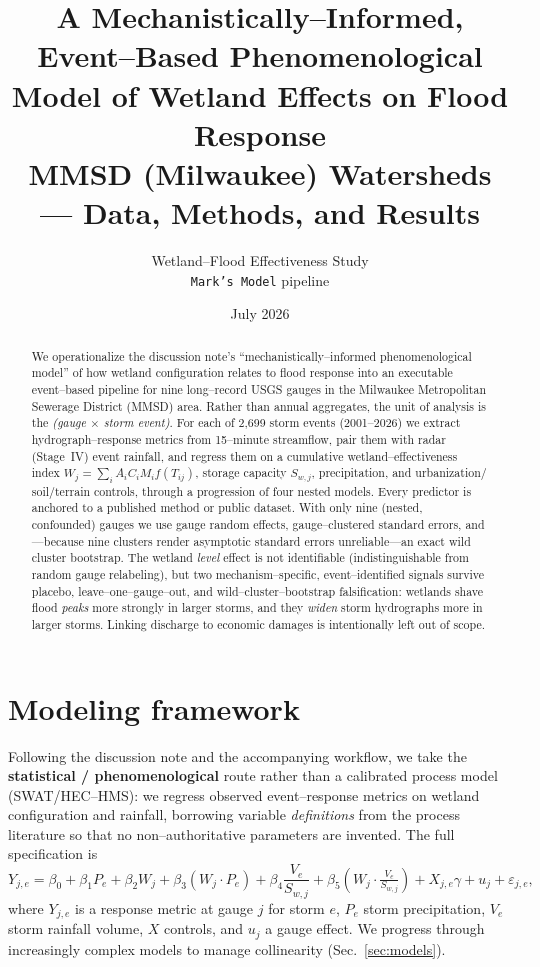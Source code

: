 \documentclass[11pt]{article}
\title{\textbf{A Mechanistically--Informed, Event--Based Phenomenological Model
of Wetland Effects on Flood Response} \\[4pt]
\large MMSD (Milwaukee) Watersheds --- Data, Methods, and Results}
\author{Wetland--Flood Effectiveness Study \\ \texttt{Mark's Model} pipeline}
\date{July 2026}
\newcommand{\Wj}{W_{j}}
\newcommand{\Swj}{S_{w,j}}
\begin{document}
\maketitle

\begin{abstract}
\noindent
We operationalize the discussion note's ``mechanistically--informed phenomenological
model'' of how wetland configuration relates to flood response into an executable
event--based pipeline for nine long--record USGS gauges in the Milwaukee Metropolitan
Sewerage District (MMSD) area. Rather than annual aggregates, the unit of analysis is the
\emph{(gauge $\times$ storm event)}. For each of 2{,}699 storm events (2001--2026) we
extract hydrograph--response metrics from 15--minute streamflow, pair them with radar
(Stage~IV) event rainfall, and regress them on a cumulative wetland--effectiveness index
$\Wj=\sum_i A_i C_i M_i f(T_{ij})$, storage capacity $\Swj$, precipitation, and urbanization/
soil/terrain controls, through a progression of four nested models. Every predictor is
anchored to a published method or public dataset. With only nine (nested, confounded) gauges
we use gauge random effects, gauge--clustered standard errors, and---because nine clusters
render asymptotic standard errors unreliable---an exact wild cluster bootstrap. The wetland
\emph{level} effect is not identifiable (indistinguishable from random gauge relabeling), but
two mechanism--specific, event--identified signals survive placebo, leave--one--gauge--out,
and wild--cluster--bootstrap falsification: wetlands shave flood \emph{peaks} more strongly in
larger storms, and they \emph{widen} storm hydrographs more in larger storms. Linking discharge
to economic damages is intentionally left out of scope.
\end{abstract}

\section{Modeling framework}
Following the discussion note and the accompanying workflow, we take the
\textbf{statistical / phenomenological} route rather than a calibrated process model
(SWAT/HEC--HMS): we regress observed event--response metrics on wetland configuration and
rainfall, borrowing variable \emph{definitions} from the process literature so that no
non--authoritative parameters are invented. The full specification is
\begin{equation}
Y_{j,e} = \beta_0 + \beta_1 P_e + \beta_2 \Wj + \beta_3 (\Wj\!\cdot\!P_e)
   + \beta_4 \frac{V_e}{\Swj} + \beta_5\!\left(\Wj\!\cdot\!\tfrac{V_e}{\Swj}\right)
   + X_{j,e}\gamma + u_j + \varepsilon_{j,e},
\label{eq:full}
\end{equation}
where $Y_{j,e}$ is a response metric at gauge $j$ for storm $e$, $P_e$ storm precipitation,
$V_e$ storm rainfall volume, $X$ controls, and $u_j$ a gauge effect. We progress through
increasingly complex models to manage collinearity (Sec.~\ref{sec:models}).
\end{document}
